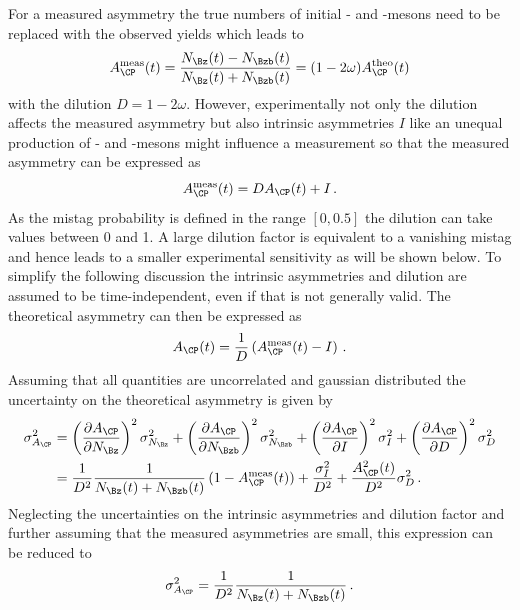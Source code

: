 For a measured asymmetry the true numbers of initial \Bz- and \Bzb-mesons need to be replaced with the observed yields which leads to
\begin{equation}
A_{\CP}^{\text{meas}}(t)=\frac{N_{\Bz}(t)-N_{\Bzb}(t)}{N_{\Bz}(t)+N_{\Bzb}(t)}=(1-2\omega)A_{\CP}^{\text{theo}}(t)
\end{equation}
with the dilution $D=1-2\omega$.
However, experimentally not only the dilution affects the measured asymmetry but also intrinsic asymmetries $I$ like an unequal production of \Bz- and \Bzb-mesons might influence a measurement so that the measured asymmetry can be expressed as
\begin{equation}
A_{\CP}^{\text{meas}}(t)=DA_{\CP}(t)+I\,.
\end{equation}
As the mistag probability is defined in the range $[0, 0.5]$ the dilution can take values between \num{0} and \num{1}.
A large dilution factor is equivalent to a vanishing mistag and hence leads to a smaller experimental sensitivity as will be shown below.
To simplify the following discussion the intrinsic asymmetries and dilution are assumed to be time-independent, even if that is not generally valid.
The theoretical asymmetry can then be expressed as
\begin{equation}
A_{\CP}(t)=\frac{1}{D}\left(A_{\CP}^{\text{meas}}(t)-I\right)\,.
\end{equation}
Assuming that all quantities are uncorrelated and gaussian distributed the uncertainty on the theoretical asymmetry is given by
\begin{equation}
\begin{aligned}
\sigma_{A_{\CP}}^2&=\left(\frac{\partial A_{\CP}}{\partial N_{\Bz}}\right)^2\sigma_{N_{\Bz}}^2+\left(\frac{\partial A_{\CP}}{\partial N_{\Bzb}}\right)^2\sigma_{N_{\Bzb}}^2+\left(\frac{\partial A_{\CP}}{\partial I}\right)^2\sigma_{I}^2+\left(\frac{\partial A_{\CP}}{\partial D}\right)^2\sigma_{D}^2\\
&=\frac{1}{D^2}\frac{1}{N_{\Bz}(t)+N_{\Bzb}(t)}\left(1-A_{\CP}^{\text{meas}}(t)\right)+\frac{\sigma_{I}^2}{D^2}+\frac{A_{\CP}^2(t)}{D^2}\sigma_{D}^2\,.
\end{aligned}
\end{equation}
Neglecting the uncertainties on the intrinsic asymmetries and dilution factor and further assuming that the measured asymmetries are small, this expression can be reduced to
\begin{equation}
\sigma_{A_{\CP}}^2=\frac{1}{D^2}\frac{1}{N_{\Bz}(t)+N_{\Bzb}(t)}\,.
\end{equation}
